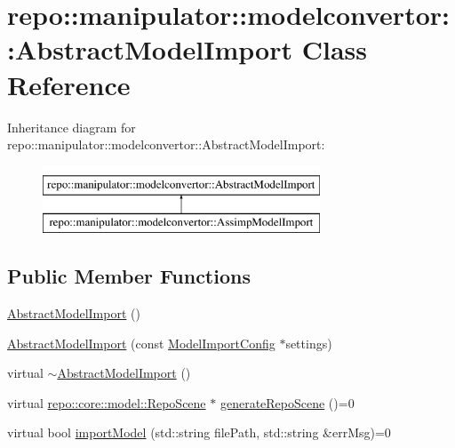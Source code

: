 \hypertarget{classrepo_1_1manipulator_1_1modelconvertor_1_1_abstract_model_import}{}\section{repo\+:\+:manipulator\+:\+:modelconvertor\+:\+:Abstract\+Model\+Import Class Reference}
\label{classrepo_1_1manipulator_1_1modelconvertor_1_1_abstract_model_import}
Inheritance diagram for repo\+:\+:manipulator\+:\+:modelconvertor\+:\+:Abstract\+Model\+Import\+:\begin{figure}[H]
\begin{center}
\leavevmode
\includegraphics[height=2.000000cm]{classrepo_1_1manipulator_1_1modelconvertor_1_1_abstract_model_import}
\end{center}
\end{figure}
\subsection*{Public Member Functions}
\begin{DoxyCompactItemize}
\item 
\hyperlink{classrepo_1_1manipulator_1_1modelconvertor_1_1_abstract_model_import_a45ba12f9052b3cca1f1564bd5a05a8d8}{Abstract\+Model\+Import} ()
\item 
\hyperlink{classrepo_1_1manipulator_1_1modelconvertor_1_1_abstract_model_import_aed08f039d5132cde96f8c651f33b7877}{Abstract\+Model\+Import} (const \hyperlink{classrepo_1_1manipulator_1_1modelconvertor_1_1_model_import_config}{Model\+Import\+Config} $\ast$settings)
\item 
virtual \hyperlink{classrepo_1_1manipulator_1_1modelconvertor_1_1_abstract_model_import_a264ed6f9684aa0cf2216743e9f3c47cc}{$\sim$\+Abstract\+Model\+Import} ()
\item 
virtual \hyperlink{classrepo_1_1core_1_1model_1_1_repo_scene}{repo\+::core\+::model\+::\+Repo\+Scene} $\ast$ \hyperlink{classrepo_1_1manipulator_1_1modelconvertor_1_1_abstract_model_import_a0a0761d0a92ca05542b569a079f99c8f}{generate\+Repo\+Scene} ()=0
\item 
virtual bool \hyperlink{classrepo_1_1manipulator_1_1modelconvertor_1_1_abstract_model_import_a2b6296ea483d39f7ce6fe1e8a78124fd}{import\+Model} (std\+::string file\+Path, std\+::string \&err\+Msg)=0
\end{DoxyCompactItemize}
